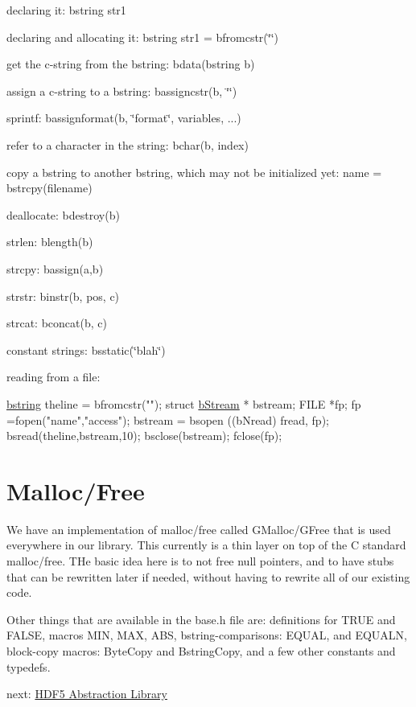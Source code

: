 \begin{DoxyItemize}
\item declaring it\+: {\ttfamily bstring str1} \item declaring and allocating it\+: {\ttfamily bstring str1 = bfromcstr(\char`\"{}\char`\"{})} \item get the c-\/string from the bstring\+: {\ttfamily bdata(bstring b)} \item assign a c-\/string to a bstring\+: {\ttfamily bassigncstr(b, \char`\"{}\char`\"{})} \item sprintf\+: {\ttfamily bassignformat(b, \char`\"{}format\char`\"{}, variables, ...)} \item refer to a character in the string\+: {\ttfamily bchar(b, index)} \item copy a bstring to another bstring, which may not be initialized yet\+: {\ttfamily name = bstrcpy(filename)} \item deallocate\+: {\ttfamily bdestroy(b)} \item strlen\+: {\ttfamily blength(b)} \item strcpy\+: {\ttfamily bassign(a,b)} \item strstr\+: {\ttfamily binstr(b, pos,  c)} \item strcat\+: {\ttfamily bconcat(b, c)} \item constant strings\+: {\ttfamily bsstatic(\char`\"{}blah\char`\"{})} \item reading from a file\+:\end{DoxyItemize}

\begin{DoxyCode}
\hyperlink{structtagbstring}{bstring} theline = bfromcstr(\textcolor{stringliteral}{""});
\textcolor{keyword}{struct }\hyperlink{structbStream}{bStream} * bstream;
FILE *fp;
fp =fopen(\textcolor{stringliteral}{"name"},\textcolor{stringliteral}{"access"});
bstream = bsopen ((bNread) fread, fp);
bsread(theline,bstream,10);
bsclose(bstream);
fclose(fp);
\end{DoxyCode}
\hypertarget{base_library_base_mallocfree}{}\section{Malloc/\+Free}\label{base_library_base_mallocfree}
 

We have an implementation of malloc/free called G\+Malloc/\+G\+Free that is used everywhere in our library. This currently is a thin layer on top of the C standard malloc/free. T\+He basic idea here is to not free null pointers, and to have stubs that can be rewritten later if needed, without having to rewrite all of our existing code.

 Other things that are available in the {\ttfamily base.\+h} file are\+: definitions for {\ttfamily T\+R\+U\+E} and {\ttfamily F\+A\+L\+S\+E}, macros {\ttfamily M\+I\+N}, {\ttfamily M\+A\+X}, {\ttfamily A\+B\+S}, bstring-\/comparisons\+: {\ttfamily E\+Q\+U\+A\+L}, and {\ttfamily E\+Q\+U\+A\+L\+N}, block-\/copy macros\+: {\ttfamily Byte\+Copy} and {\ttfamily Bstring\+Copy}, and a few other constants and typedefs.

next\+: \hyperlink{hdf_library}{H\+D\+F5 Abstraction Library} 